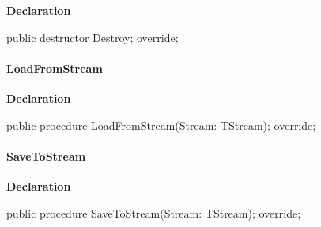 \documentclass{report}
\newif\ifpdf
\begin{document}
\label{opbitmapformats.TJPEGImage-Destroy}
\begin{list}{}{
\setlength{\itemindent}{0cm}
\setlength{\listparindent}{0cm}
\setlength{\leftmargin}{\evensidemargin}
\addtolength{\leftmargin}{\tmplength}
\settowidth{\labelsep}{X}
\addtolength{\leftmargin}{\labelsep}
\setlength{\labelwidth}{\tmplength}
}
\item[\textbf{Declaration}\hfill]
\ifpdf
\begin{flushleft}
\fi
\begin{ttfamily}
public destructor Destroy; override;\end{ttfamily}

\ifpdf
\end{flushleft}
\fi

\end{list}
\paragraph*{LoadFromStream}\hspace*{\fill}

\label{opbitmapformats.TJPEGImage-LoadFromStream}
\begin{list}{}{
\setlength{\itemindent}{0cm}
\setlength{\listparindent}{0cm}
\setlength{\leftmargin}{\evensidemargin}
\addtolength{\leftmargin}{\tmplength}
\settowidth{\labelsep}{X}
\addtolength{\leftmargin}{\labelsep}
\setlength{\labelwidth}{\tmplength}
}
\item[\textbf{Declaration}\hfill]
\ifpdf
\begin{flushleft}
\fi
\begin{ttfamily}
public procedure LoadFromStream(Stream: TStream); override;\end{ttfamily}

\ifpdf
\end{flushleft}
\fi

\end{list}
\paragraph*{SaveToStream}\hspace*{\fill}

\label{opbitmapformats.TJPEGImage-SaveToStream}
\begin{list}{}{
\setlength{\itemindent}{0cm}
\setlength{\listparindent}{0cm}
\setlength{\leftmargin}{\evensidemargin}
\addtolength{\leftmargin}{\tmplength}
\settowidth{\labelsep}{X}
\addtolength{\leftmargin}{\labelsep}
\setlength{\labelwidth}{\tmplength}
}
\item[\textbf{Declaration}\hfill]
\ifpdf
\begin{flushleft}
\fi
\begin{ttfamily}
public procedure SaveToStream(Stream: TStream); override;\end{ttfamily}

\ifpdf
\end{flushleft}
\fi

\end{list}
\ifpdf
\end{document}
